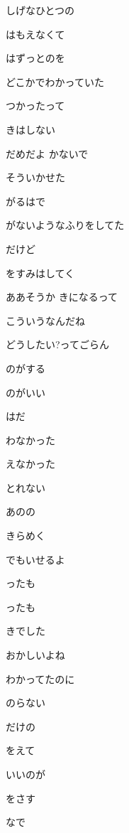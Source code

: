 \documentclass[14pt]{ltjsarticle}
\begin{document}
{\item
  しげなひとつの
  \jisho{}

  はもえなくて
  \jisho{}

\item
  はずっとのを
  \jisho{}

  どこかでわかっていた
  \jisho{}

  つかったって
  \jisho{}

  きはしない
  \jisho{}

  だめだよ かないで
  \jisho{}

  そういかせた
  \jisho{}

\item
  がるはで
  \jisho{}

  がないようなふりをしてた
  \jisho{}

  だけど
  \jisho{}

  をすみはしてく
  \jisho{}

  ああそうか きになるって
  \jisho{}

  こういうなんだね
  \jisho{}

\item
  どうしたい?ってごらん
  \jisho{}

  のがする
  \jisho{}

  のがいい
  \jisho{}

  はだ
  \jisho{}

\item
  わなかった
  \jisho{}

  えなかった
  \jisho{}

  とれない
  \jisho{}

\item
  あのの
  \jisho{}

  きらめく
  \jisho{}

  でもいせるよ
  \jisho{}

  ったも
  \jisho{}

  ったも
  \jisho{}

  きでした
  \jisho{}

  おかしいよね
  \jisho{}

  わかってたのに
  \jisho{}

  のらない
  \jisho{}

  だけの
  \jisho{}

  をえて
  \jisho{}

  いいのが
  \jisho{}

  をさす
  \jisho{}

  なで
  \jisho{}

  
}
\end{document}
